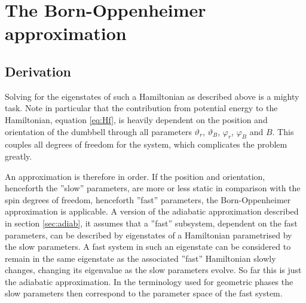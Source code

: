 \documentclass[a4paper]{article}
\begin{document}
\section{The Born-Oppenheimer approximation}
\subsection{Derivation}
Solving for the eigenstates of such a Hamiltonian as described above is a mighty task. Note
in particular that the contribution from potential energy to the Hamiltonian, equation
\ref{eq:Hf}, is heavily dependent on the position and orientation of the dumbbell through all
parameters \(\vartheta_r \), \(\vartheta_B\), \(\varphi_r\),
\(\varphi_B\) and \(B\). This couples all degrees of freedom for the system, which complicates
the problem greatly.

An approximation is therefore in order. If the position and orientation,
henceforth the ''slow'' parameters,
are more or less static in comparison with the spin degrees of freedom, henceforth ''fast''
parameters, the Born-Oppenheimer approximation is applicable. A version of the
adiabatic approximation described in section \ref{sec:adiab}, it assumes that a ''fast''
subsystem, dependent on the fast
parameters, can be described by eigenstates of a Hamiltonian parametrised by the slow
parameters. A fast system in such an eigenstate can be considered to remain in the same
eigenstate as the associated ''fast'' Hamiltonian slowly changes, changing its
eigenvalue as the slow parameters evolve. So far this is just the adiabatic
approximation. In the terminology used for geometric phases the slow
parameters then correspond to the parameter space of the fast system. %
\end{document}
